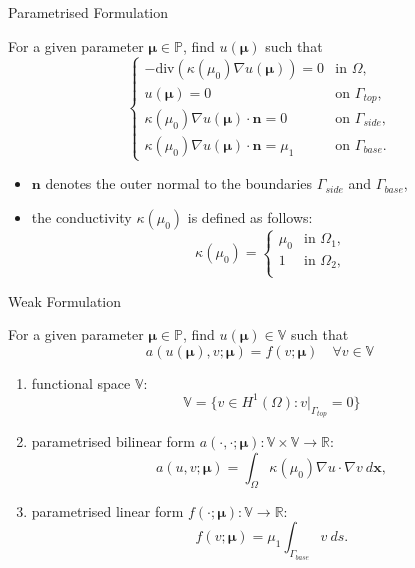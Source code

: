 \documentclass[9pt]{beamer}
\begin{document}
\begin{frame}{Parametrised Formulation}
\begin{exampleblock}{}
For a given parameter $\boldsymbol{\mu}\in\mathbb{P}$, find $u(\boldsymbol{\mu})$ such that
$$
\begin{cases}
	- \text{div} (\kappa(\mu_0)\nabla u(\boldsymbol{\mu})) = 0 & \text{in } \Omega,\\
	u(\boldsymbol{\mu}) = 0 & \text{on } \Gamma_{top},\\
	\kappa(\mu_0)\nabla u(\boldsymbol{\mu})\cdot \mathbf{n} = 0 & \text{on } \Gamma_{side},\\
	\kappa(\mu_0)\nabla u(\boldsymbol{\mu})\cdot \mathbf{n} = \mu_1 & \text{on } \Gamma_{base}.
\end{cases}
$$
\end{exampleblock}

\begin{block}{}
\begin{itemize}
    \item $\mathbf{n}$ denotes the outer normal to the boundaries $\Gamma_{side}$ and $\Gamma_{base}$,
    \item the conductivity $\kappa(\mu_0)$ is defined as follows:
    $$
\kappa(\mu_0) =
\begin{cases}
	\mu_0 & \text{in } \Omega_1,\\
	1 & \text{in } \Omega_2,\\
\end{cases}
$$
\end{itemize}
\end{block}
\end{frame}

\begin{frame}{Weak Formulation}
\begin{exampleblock}{}
For a given parameter $\boldsymbol{\mu}\in\mathbb{P}$, find $u(\boldsymbol{\mu})\in\mathbb{V}$ such that
$$a\left(u(\boldsymbol{\mu}),v;\boldsymbol{\mu}\right)=f(v;\boldsymbol{\mu})\quad \forall v\in\mathbb{V}$$
\end{exampleblock}

\begin{block}{}
\begin{enumerate}
    \item functional space $\mathbb{V}$:
$$
\mathbb{V} = \{v\in H^1(\Omega) : v|_{\Gamma_{top}}=0\}
$$
    \item parametrised bilinear form $a(\cdot, \cdot; \boldsymbol{\mu}): \mathbb{V} \times \mathbb{V} \to \mathbb{R}$:
$$a(u, v;\boldsymbol{\mu})=\int_{\Omega} \kappa(\mu_0)\nabla u\cdot \nabla v \ d\boldsymbol{x},$$
    \item parametrised linear form $f(\cdot; \boldsymbol{\mu}): \mathbb{V} \to \mathbb{R}$:
$$f(v; \boldsymbol{\mu})= \mu_1\int_{\Gamma_{base}}v \ ds.$$
\end{enumerate}
\end{block}
\end{frame}
\end{document}
